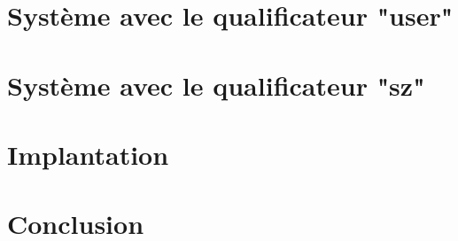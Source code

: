 \documentclass[a4paper,11pt]{memoir}
\begin{document}


\chapter{Système avec le qualificateur "user"}



\chapter{Système avec le qualificateur "sz"}



\chapter{Implantation}



\chapter{Conclusion}



\backmatter


\listoffigures




\end{document}
